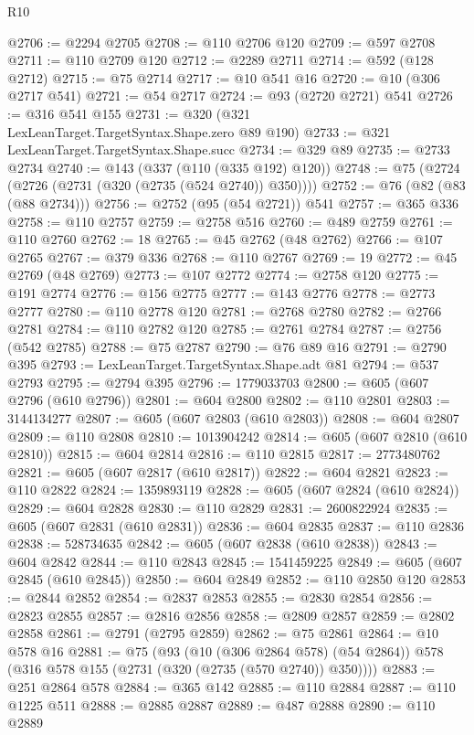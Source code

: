 \begin{lexlean}{R10}
\begin{coremodule}
@2706 := @2294 @2705
@2708 := @110 @2706 @120
@2709 := @597 @2708
@2711 := @110 @2709 @120
@2712 := @2289 @2711
@2714 := @592 (@128 @2712)
@2715 := @75 @2714
@2717 := @10 @541 @16
@2720 := @10 (@306 @2717 @541)
@2721 := @54 @2717
@2724 := @93 (@2720 @2721) @541
@2726 := @316 @541 @155
@2731 := @320 (@321 LexLeanTarget.TargetSyntax.Shape.zero @89 @190)
@2733 := @321 LexLeanTarget.TargetSyntax.Shape.succ
@2734 := @329 @89
@2735 := @2733 @2734
@2740 := @143 (@337 (@110 (@335 @192) @120))
@2748 := @75 (@2724 (@2726 (@2731 (@320 (@2735 (@524 @2740)) @350))))
@2752 := @76 (@82 (@83 (@88 @2734)))
@2756 := @2752 (@95 (@54 @2721)) @541
@2757 := @365 @336
@2758 := @110 @2757
@2759 := @2758 @516
@2760 := @489 @2759
@2761 := @110 @2760
@2762 := 18
@2765 := @45 @2762 (@48 @2762)
@2766 := @107 @2765
@2767 := @379 @336
@2768 := @110 @2767
@2769 := 19
@2772 := @45 @2769 (@48 @2769)
@2773 := @107 @2772
@2774 := @2758 @120
@2775 := @191 @2774
@2776 := @156 @2775
@2777 := @143 @2776
@2778 := @2773 @2777
@2780 := @110 @2778 @120
@2781 := @2768 @2780
@2782 := @2766 @2781
@2784 := @110 @2782 @120
@2785 := @2761 @2784
@2787 := @2756 (@542 @2785)
@2788 := @75 @2787
@2790 := @76 @89 @16
@2791 := @2790 @395
@2793 := LexLeanTarget.TargetSyntax.Shape.adt @81
@2794 := @537 @2793
@2795 := @2794 @395
@2796 := 1779033703
@2800 := @605 (@607 @2796 (@610 @2796))
@2801 := @604 @2800
@2802 := @110 @2801
@2803 := 3144134277
@2807 := @605 (@607 @2803 (@610 @2803))
@2808 := @604 @2807
@2809 := @110 @2808
@2810 := 1013904242
@2814 := @605 (@607 @2810 (@610 @2810))
@2815 := @604 @2814
@2816 := @110 @2815
@2817 := 2773480762
@2821 := @605 (@607 @2817 (@610 @2817))
@2822 := @604 @2821
@2823 := @110 @2822
@2824 := 1359893119
@2828 := @605 (@607 @2824 (@610 @2824))
@2829 := @604 @2828
@2830 := @110 @2829
@2831 := 2600822924
@2835 := @605 (@607 @2831 (@610 @2831))
@2836 := @604 @2835
@2837 := @110 @2836
@2838 := 528734635
@2842 := @605 (@607 @2838 (@610 @2838))
@2843 := @604 @2842
@2844 := @110 @2843
@2845 := 1541459225
@2849 := @605 (@607 @2845 (@610 @2845))
@2850 := @604 @2849
@2852 := @110 @2850 @120
@2853 := @2844 @2852
@2854 := @2837 @2853
@2855 := @2830 @2854
@2856 := @2823 @2855
@2857 := @2816 @2856
@2858 := @2809 @2857
@2859 := @2802 @2858
@2861 := @2791 (@2795 @2859)
@2862 := @75 @2861
@2864 := @10 @578 @16
@2881 := @75
    (@93
      (@10 (@306 @2864 @578) (@54 @2864))
      @578
      (@316 @578 @155 (@2731 (@320 (@2735 (@570 @2740)) @350))))
@2883 := @251 @2864 @578
@2884 := @365 @142
@2885 := @110 @2884
@2887 := @110 @1225 @511
@2888 := @2885 @2887
@2889 := @487 @2888
@2890 := @110 @2889

\end{coremodule}
\end{lexlean}
